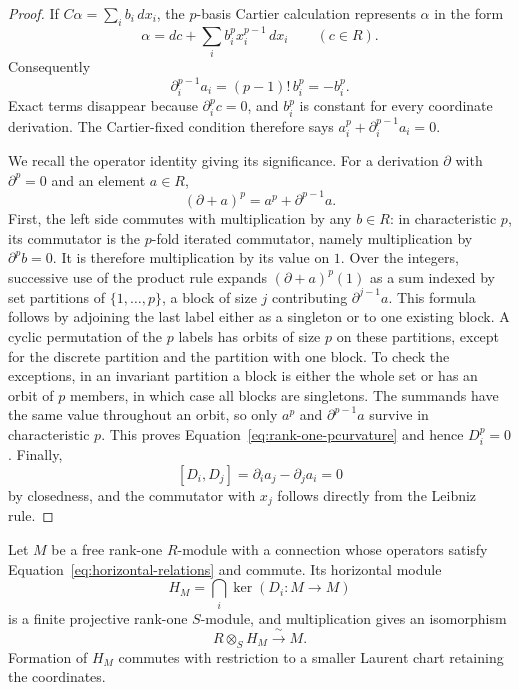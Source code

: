 \begin{proof}
If \(C\alpha=\sum_i b_i\,dx_i\), the \(p\)-basis Cartier
calculation represents \(\alpha\) in the form
\[
 \alpha=dc+\sum_i b_i^p x_i^{p-1}\,dx_i
 \qquad(c\in R).
\]
Consequently
\begin{equation}
 \partial_i^{p-1}a_i
   =(p-1)!\,b_i^p=-b_i^p.
 \label{eq:cartier-coefficient}
\end{equation}
Exact terms disappear because \(\partial_i^p c=0\), and
\(b_i^p\) is constant for every coordinate derivation.
The Cartier-fixed condition therefore says
\(a_i^p+\partial_i^{p-1}a_i=0\).

We recall the operator identity giving its significance.  For a
derivation \(\partial\) with \(\partial^p=0\) and an element
\(a\in R\),
\begin{equation}
                 (\partial+a)^p=a^p+\partial^{p-1}a.
 \label{eq:rank-one-pcurvature}
\end{equation}
First, the left side commutes with multiplication by any \(b\in R\):
in characteristic \(p\), its commutator is the \(p\)-fold
iterated commutator, namely multiplication by \(\partial^p b=0\).
It is therefore multiplication by its value on \(1\).
Over the integers, successive use of the product rule expands
\((\partial+a)^p(1)\) as a sum indexed by set partitions of
\(\{1,\ldots,p\}\), a block of size \(j\) contributing
\(\partial^{j-1}a\).  This formula follows by adjoining the last
label either as a singleton or to one existing block.
A cyclic permutation of the \(p\) labels has orbits of size
\(p\) on these partitions, except for the discrete partition and
the partition with one block.  To check the exceptions, in an
invariant partition a block is either the whole set or has an orbit
of \(p\) members,
in which case all blocks are singletons.  The summands have the
same value throughout an orbit, so only \(a^p\) and
\(\partial^{p-1}a\) survive in characteristic \(p\).
This proves Equation~\eqref{eq:rank-one-pcurvature} and hence
\(D_i^p=0\).  Finally,
\[
 [D_i,D_j]=\partial_i a_j-\partial_j a_i=0
\]
by closedness, and the commutator with \(x_j\) follows directly
from the Leibniz rule.
\end{proof}

\begin{lemma}
\label{lem:horizontal-expansion}
Let \(M\) be a free rank-one \(R\)-module with a connection
whose operators satisfy Equation~\eqref{eq:horizontal-relations}
and commute.  Its horizontal module
\[
 H_M=\bigcap_i\ker(D_i:M\to M)
\]
is a finite projective rank-one \(S\)-module, and multiplication
gives an isomorphism
\begin{equation}
                 R\otimes_S H_M\xrightarrow{\ \sim\ }M.
 \label{eq:horizontal-descent}
\end{equation}
Formation of \(H_M\) commutes with restriction to a smaller
Laurent chart retaining the coordinates.
\end{lemma}

